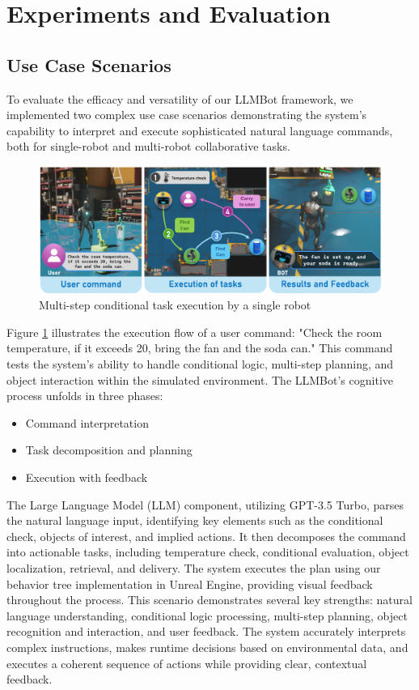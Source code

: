\documentclass[pdflatex,sn-mathphys-num]{sn-jnl}
\theoremstyle{thmstyleone}
\theoremstyle{thmstyletwo}%
\theoremstyle{thmstylethree}%
\begin{document}
\section{Experiments and Evaluation}
\subsection{Use Case Scenarios}


To evaluate the efficacy and versatility of our LLMBot framework, we implemented two complex use case scenarios demonstrating the system's capability to interpret and execute sophisticated natural language commands, both for single-robot and multi-robot collaborative tasks.
\begin{figure}[H]
    \centering
    \includegraphics[width=1\textwidth]{figures/scenario1.png}
    \caption{Multi-step conditional task execution by a single robot}\label{scenario1}
    \end{figure}
    
Figure \ref{scenario1} illustrates the execution flow of a user command: "Check the room temperature, if it exceeds 20, bring the fan and the soda can." This command tests the system's ability to handle conditional logic, multi-step planning, and object interaction within the simulated environment. The LLMBot's cognitive process unfolds in three phases:
\begin{itemize}
    \item Command interpretation
    \item Task decomposition and planning
    \item Execution with feedback
\end{itemize}

The Large Language Model (LLM) component, utilizing GPT-3.5 Turbo, parses the natural language input, identifying key elements such as the conditional check, objects of interest, and implied actions. It then decomposes the command into actionable tasks, including temperature check, conditional evaluation, object localization, retrieval, and delivery. The system executes the plan using our behavior tree implementation in Unreal Engine, providing visual feedback throughout the process.
This scenario demonstrates several key strengths: natural language understanding, conditional logic processing, multi-step planning, object recognition and interaction, and user feedback. The system accurately interprets complex instructions, makes runtime decisions based on environmental data, and executes a coherent sequence of actions while providing clear, contextual feedback.
\end{document}
